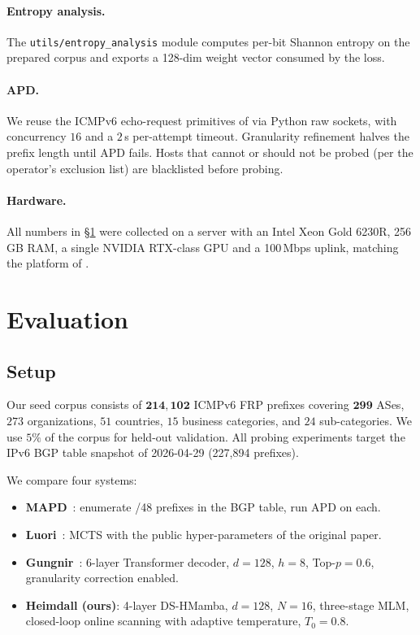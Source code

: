 \documentclass[conference]{IEEEtran}
\begin{document}
\paragraph{Entropy analysis.}  The \texttt{utils/entropy\_analysis}
module computes per-bit Shannon entropy on the prepared corpus and
exports a 128-dim weight vector consumed by the loss.

\paragraph{APD.}  We reuse the ICMPv6 echo-request primitives of
\cite{gasser2018clusters} via Python raw sockets, with concurrency $16$
and a $2\,$s per-attempt timeout.  Granularity refinement halves the
prefix length until APD fails.  Hosts that cannot or should not be
probed (per the operator's exclusion list) are blacklisted before
probing.

\paragraph{Hardware.}  All numbers in \S\ref{sec:eval} were collected
on a server with an Intel Xeon Gold 6230R, 256\,GB RAM, a single
NVIDIA RTX-class GPU and a 100\,Mbps uplink, matching the platform of
\cite{gungnir2025}.

\section{Evaluation}\label{sec:eval}

\subsection{Setup}
Our seed corpus consists of $\mathbf{214{,}102}$ ICMPv6 FRP prefixes
covering $\mathbf{299}$ ASes, $273$ organizations, $51$ countries,
$15$ business categories, and $24$ sub-categories.  We use $5\%$ of
the corpus for held-out validation.  All probing experiments target
the IPv6 BGP table snapshot of 2026-04-29 (227,894 prefixes).

We compare four systems:
\begin{itemize}
\item \textbf{MAPD}~\cite{gasser2018clusters}: enumerate /48 prefixes
      in the BGP table, run APD on each.
\item \textbf{Luori}~\cite{luori2024}: MCTS with the public
      hyper-parameters of the original paper.
\item \textbf{Gungnir}~\cite{gungnir2025}: 6-layer Transformer
      decoder, $d{=}128$, $h{=}8$, Top-$p{=}0.6$, granularity
      correction enabled.
\item \textbf{Heimdall (ours)}: 4-layer DS-HMamba, $d{=}128$,
      $N{=}16$, three-stage MLM, closed-loop online scanning with
      adaptive temperature, $T_{0}{=}0.8$.
\end{itemize}
\end{document}
